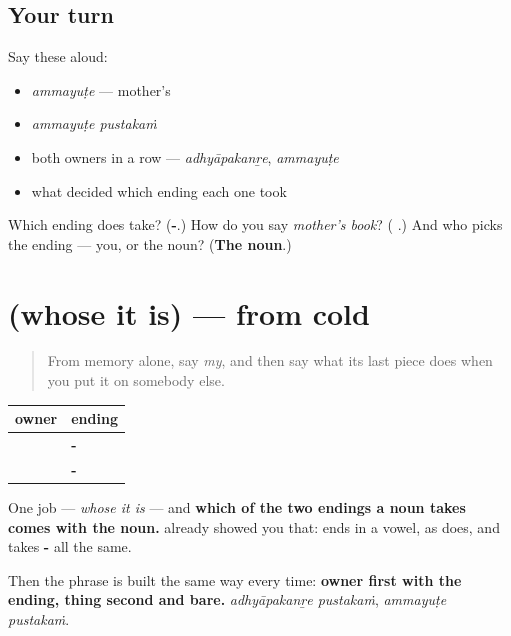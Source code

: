 \subsection*{Your turn}
Say these aloud:

\begin{itemize}
\raggedright
  \item \emph{ammayuṭe} — mother's
  \item \emph{ammayuṭe pustakaṁ}
  \item both owners in a row — \emph{adhyāpakanṟe}, \emph{ammayuṭe}
  \item what decided which ending each one took
\end{itemize}

\begin{tcolorbox}[breakable,colback=teal!4,colframe=teal!35!black,title={Before you move on}]
Which ending does \textbf{} take? (\textbf{-}.) How do you say \emph{mother's book}? (\emph{\textbf{ }}.) And who picks the ending — you, or the noun? (\textbf{The noun}.)
\end{tcolorbox}
\section[(whose it is)]{(whose it is) — from cold}

\label{lesson:ML-R78-genitive-recall}



\begin{quote}
From memory alone, say \emph{my}, and then say what its last piece does when you put it on somebody else.
\end{quote}

\begin{grammarlens}[title={Grammar Lens: two endings, one job, and the noun decides}]
\noindent
\begin{tabularx}{\linewidth}{@{}>{\raggedright\arraybackslash}X>{\raggedright\arraybackslash}X@{}}
\toprule
\textbf{owner} & \textbf{ending} \\
\midrule
\textbf{\ml{അധ്യാപകന്റെ}} & \textbf{-\ml{ന്റെ}} \\
\textbf{\ml{അമ്മയുടെ}} & \textbf{-\ml{യുടെ}} \\
\bottomrule
\end{tabularx}

One job — \emph{whose it is} — and \textbf{which of the two endings a noun takes comes with the noun.} \textbf{} already showed you that: \textbf{} ends in a vowel, as \textbf{} does, and takes \textbf{-} all the same.

Then the phrase is built the same way every time: \textbf{owner first with the ending, thing second and bare.} \emph{adhyāpakanṟe pustakaṁ}, \emph{ammayuṭe pustakaṁ}.
\end{grammarlens}

